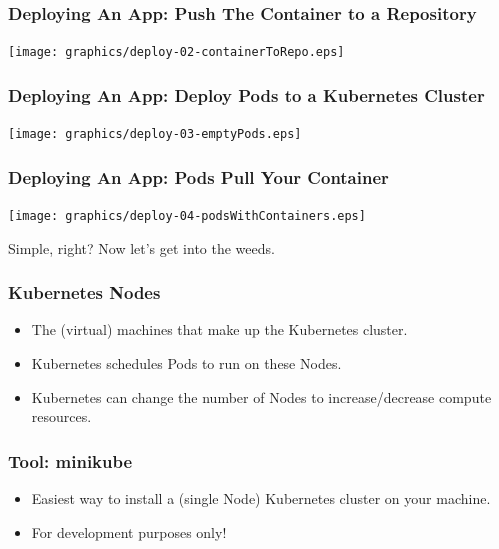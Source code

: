     \begin{frame}
        \frametitle{Deploying An App: Push The Container to a Repository}
        \texttt{[image: graphics/deploy-02-containerToRepo.eps]}
    \end{frame}

    \begin{frame}
        \frametitle{Deploying An App: Deploy Pods to a Kubernetes Cluster}
        \texttt{[image: graphics/deploy-03-emptyPods.eps]}
    \end{frame}

    \begin{frame}
        \frametitle{Deploying An App: Pods Pull Your Container}
        \texttt{[image: graphics/deploy-04-podsWithContainers.eps]}
    \end{frame}

    \begin{frame}
        \begin{center}
            \Huge Simple, right? Now let's get into the weeds.
        \end{center}
    \end{frame}

    \begin{frame}
        \frametitle{Kubernetes Nodes}
        \begin{itemize}
            \item The (virtual) machines that make up the Kubernetes cluster.\pause
            \item Kubernetes schedules Pods to run on these Nodes.\pause
            \item Kubernetes can change the number of Nodes to increase/decrease compute resources.
        \end{itemize}
    \end{frame}

    \begin{frame}
        \frametitle{Tool: minikube\footnotemark}
        \begin{itemize}
            \item Easiest way to install a (single Node) Kubernetes cluster on your machine.
            \item For development purposes only!
        \end{itemize}
    \end{frame}

